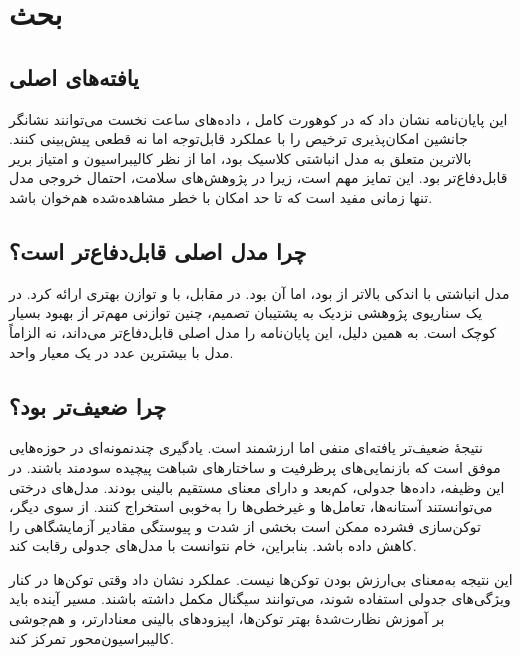 \chapter{بحث}
\label{ch:discussion}

\section{یافته‌های اصلی}
این پایان‌نامه نشان داد که در کوهورت کامل ، داده‌های  ساعت نخست  می‌توانند نشانگر جانشین امکان‌پذیری ترخیص را با عملکرد قابل‌توجه اما نه قطعی پیش‌بینی کنند. بالاترین  متعلق به مدل انباشتی کلاسیک بود، اما  از نظر کالیبراسیون و امتیاز بریر قابل‌دفاع‌تر بود. این تمایز مهم است، زیرا در پژوهش‌های سلامت، احتمال خروجی مدل تنها زمانی مفید است که تا حد امکان با خطر مشاهده‌شده هم‌خوان باشد.

\section{چرا  مدل اصلی قابل‌دفاع‌تر است؟}
مدل انباشتی با   اندکی بالاتر از  بود، اما  آن  بود. در مقابل،  با   و   توازن بهتری ارائه کرد. در یک سناریوی پژوهشی نزدیک به پشتیبان تصمیم، چنین توازنی مهم‌تر از بهبود بسیار کوچک  است. به همین دلیل، این پایان‌نامه  را مدل اصلی قابل‌دفاع‌تر می‌داند، نه الزاماً مدل با بیشترین عدد در یک معیار واحد.

\section{چرا  ضعیف‌تر بود؟}
نتیجۀ ضعیف‌تر  یافته‌ای منفی اما ارزشمند است. یادگیری چندنمونه‌ای در حوزه‌هایی موفق است که بازنمایی‌های پرظرفیت و ساختارهای شباهت پیچیده سودمند باشند. در این وظیفه، داده‌ها جدولی، کم‌بعد و دارای معنای مستقیم بالینی بودند. مدل‌های درختی می‌توانستند آستانه‌ها، تعامل‌ها و غیرخطی‌ها را به‌خوبی استخراج کنند. از سوی دیگر، توکن‌سازی فشرده ممکن است بخشی از شدت و پیوستگی مقادیر آزمایشگاهی را کاهش داده باشد. بنابراین،  خام نتوانست با مدل‌های جدولی رقابت کند.

این نتیجه به‌معنای بی‌ارزش بودن توکن‌ها نیست. عملکرد  نشان داد وقتی توکن‌ها در کنار ویژگی‌های جدولی استفاده شوند، می‌توانند سیگنال مکمل داشته باشند. مسیر آینده باید بر آموزش نظارت‌شدۀ بهتر توکن‌ها، اپیزودهای بالینی معنادارتر، و هم‌جوشی کالیبراسیون‌محور تمرکز کند.

